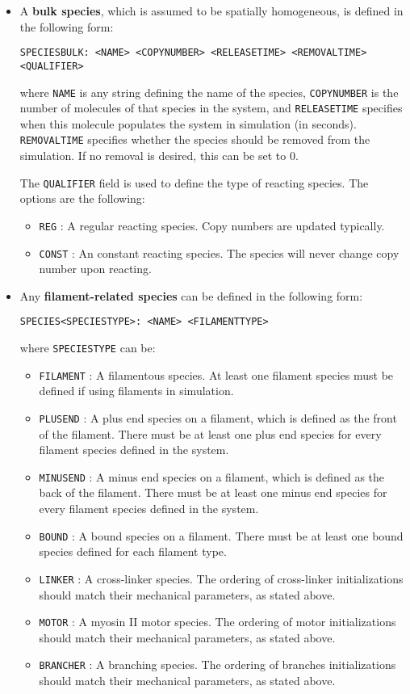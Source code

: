 \documentclass[11pt, oneside]{article}   	%
\begin{document}
\begin{itemize}
\item
A \textbf{bulk species}, which is assumed to be spatially homogeneous, is defined in the following form:\newline\newline\centerline{\texttt{SPECIESBULK: <NAME> <COPYNUMBER> <RELEASETIME> <REMOVALTIME> <QUALIFIER>}}\newline\newline where \texttt{NAME} is any string defining the name of the species, \texttt{COPYNUMBER} is the number of molecules of that species in the system, and \texttt{RELEASETIME} specifies when this molecule populates the system in simulation (in seconds). \texttt{REMOVALTIME} specifies whether the species should be removed from the simulation. If no removal is desired, this can be set to 0.

The \texttt{QUALIFIER} field is used to define the type of reacting species. The options are the following:
\begin{itemize}
\item \texttt{REG} : A regular reacting species. Copy numbers are updated typically.
\item \texttt{CONST} : An constant reacting species. The species will never change copy number upon reacting.
\end{itemize}

\item
Any \textbf{filament-related species} can be defined in the following form:\newline\newline\centerline{\texttt{SPECIES<SPECIESTYPE>: <NAME> <FILAMENTTYPE>}}\newline\newline where \texttt{SPECIESTYPE} can be:
\begin{itemize}
\item \texttt{FILAMENT} : A filamentous species. At least one filament species must be defined if using filaments in simulation.
\item \texttt{PLUSEND} : A plus end species on a filament, which is defined as the front of the filament. There must be at least one plus end species for every filament species defined in the system.
\item \texttt{MINUSEND} : A minus end species on a filament, which is defined as the back of the filament. There must be at least one minus end species for every filament species defined in the system.
\item \texttt{BOUND} : A bound species on a filament. There must be at least one bound species defined for each filament type. \item \texttt{LINKER} : A cross-linker species. The ordering of cross-linker initializations should match their mechanical parameters, as stated above.
\item \texttt{MOTOR} : A myosin II motor species. The ordering of motor initializations should match their mechanical parameters, as stated above.
\item \texttt{BRANCHER} : A branching species. The ordering of branches initializations should match their mechanical parameters, as stated above.
\end{itemize}


\end{itemize}
\end{document}
